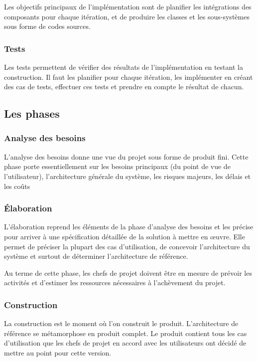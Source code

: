 \documentclass{report}
\begin{document}
Les objectifs principaux de l'implémentation sont de planifier les intégrations des composants pour chaque itération, et de produire les classes et les sous-systèmes sous forme de codes sources.

\subsubsection{Tests}
Les tests permettent de vérifier des résultats de l'implémentation en testant la construction. Il faut les planifier pour chaque itération, les implémenter en créant des cas de tests, effectuer ces tests et prendre en compte le résultat de chacun.

\subsection{Les phases}
\subsubsection{Analyse des besoins}
L'analyse des besoins donne une vue du projet sous forme de produit fini. Cette phase porte essentiellement sur les besoins principaux (du point de vue de l'utilisateur), l'architecture générale du système, les risques majeurs, les délais et les coûts

\subsubsection{Élaboration}
L'élaboration reprend les éléments de la phase d'analyse des besoins et les précise pour arriver à une spécification détaillée de la solution à mettre en œuvre. Elle permet de préciser la plupart des cas d'utilisation, de concevoir l'architecture du système et surtout de déterminer l'architecture de référence.


Au terme de cette phase, les chefs de projet doivent être en mesure de prévoir les activités et d'estimer les ressources nécessaires à l'achèvement du projet.

\subsubsection{Construction}
La construction est le moment où l'on construit le produit. L'architecture de référence se métamorphose en produit complet. Le produit contient tous les cas d'utilisation que les chefs de projet en accord avec les utilisateurs ont décidé de mettre au point pour cette version.
\end{document}

